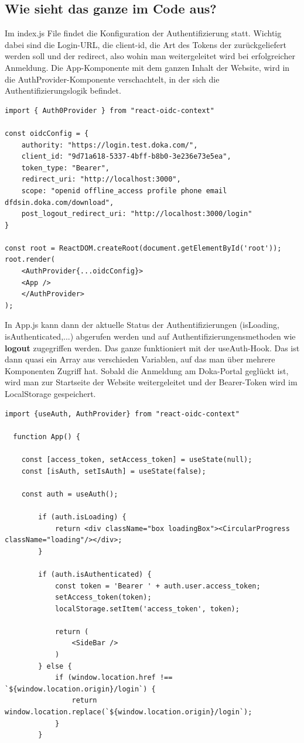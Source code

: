 \subsection*{Wie sieht das ganze im Code aus?}
Im index.js File findet die Konfiguration der Authentifizierung statt. Wichtig dabei sind die Login-URL, die client-id, die 
Art des Tokens der zurückgeliefert werden soll und der redirect, also wohin man weitergeleitet wird bei erfolgreicher Anmeldung.
Die App-Komponente mit dem ganzen Inhalt der Website, wird in die AuthProvider-Komponente verschachtelt, in der sich die 
Authentifizierungslogik befindet. 

\begin{lstlisting}[caption=index.js File mit Auth-Parametern]
  import { Auth0Provider } from "react-oidc-context"

const oidcConfig = {
    authority: "https://login.test.doka.com/",
    client_id: "9d71a618-5337-4bff-b8b0-3e236e73e5ea",
    token_type: "Bearer",
    redirect_uri: "http://localhost:3000",
    scope: "openid offline_access profile phone email dfdsin.doka.com/download",
    post_logout_redirect_uri: "http://localhost:3000/login"
}

const root = ReactDOM.createRoot(document.getElementById('root'));
root.render(
    <AuthProvider{...oidcConfig}>
    <App />
    </AuthProvider>
);
\end{lstlisting}

In App.js kann dann der aktuelle Status der Authentifizierungen (isLoading, isAuthenticated,...) abgerufen werden und 
auf Authentifizierungensmethoden wie \textbf{logout} zugegriffen werden. Das ganze funktioniert mit der useAuth-Hook. Das ist 
dann quasi ein Array aus verschieden Variablen, auf das man über mehrere Komponenten Zugriff hat. Sobald die Anmeldung am Doka-Portal 
geglückt ist, wird man zur Startseite der Website weitergeleitet und der Bearer-Token wird im LocalStorage gespeichert. 

\begin{lstlisting}[caption=App.js File - Verwalten des Auth-Status]
  import {useAuth, AuthProvider} from "react-oidc-context"

  function App() {

    const [access_token, setAccess_token] = useState(null);
    const [isAuth, setIsAuth] = useState(false);

    const auth = useAuth();

        if (auth.isLoading) {
            return <div className="box loadingBox"><CircularProgress className="loading"/></div>;
        }

        if (auth.isAuthenticated) {
            const token = 'Bearer ' + auth.user.access_token;
            setAccess_token(token);
            localStorage.setItem('access_token', token);

            return (
                <SideBar />
            )
        } else {
            if (window.location.href !== `${window.location.origin}/login`) {
                return window.location.replace(`${window.location.origin}/login`);
            }
        }
\end{lstlisting}

